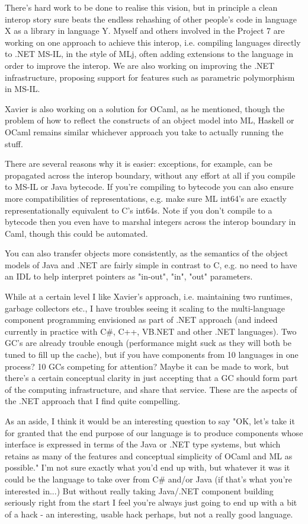 \documentclass[acmsmall,screen]{acmart}
\begin{document}
\begin{verbquote}
There's hard work to be done to realise this vision, but in principle a clean interop story sure beats the endless rehashing of other people's code in language X as a library in language Y.  Myself and others involved in the Project 7 are working on one approach to achieve this interop, i.e. compiling languages directly to .NET MS-IL, in the style of MLj, often adding extensions to the language in order to improve the interop.  We are also working on improving the .NET infrastructure, proposing support for features such as parametric polymorphism in MS-IL.  

Xavier is also working on a solution for OCaml, as he mentioned, though the problem of how to reflect the constructs of an object model into ML, Haskell or OCaml remains similar whichever approach you take to actually running the stuff.

There are several reasons why it is easier: exceptions, for example, can be propagated across the interop boundary, without any effort at all if you compile to MS-IL or Java bytecode.  If you're compiling to bytecode you can also ensure more compatibilities of representations, e.g. make sure ML int64's are exactly representationally equivalent to C's int64s.  Note if you don't compile to a bytecode then you even have to marshal integers across the interop boundary in Caml, though this could be automated.

You can also transfer objects more consistently, as the semantics of the object models of Java and .NET are fairly simple in contrast to C, e.g. no need to have an IDL to help interpret pointers as "in-out", "in", "out" parameters.

While at a certain level I like Xavier's approach, i.e. maintaining two runtimes, garbage collectors etc., I have troubles seeing it scaling to the multi-language component programming envisioned as part of .NET approach (and indeed currently in practice with C\#, C++, VB.NET and other .NET languages).  Two GC's are already trouble enough (performance might suck as they will both be tuned to fill up the cache), but if you have components from 10 languages in one process?  10 GCs competing for attention?  Maybe it can be made to work, but there's a certain conceptual clarity in just accepting that a GC should form part of the computing infrastructure, and share that service.  These are the aspects of the .NET approach that I find quite compelling.

As an aside, I think it would be an interesting question to say "OK, let's take it for granted that the end purpose of our language is to produce components whose interface is expressed in terms of the Java or .NET type systems, but which retains as many of the features and conceptual simplicity of OCaml and ML as possible."  I'm not sure exactly what you'd end up with, but whatever it was it could be the language to take over from C\# and/or Java (if that's what you're interested in...)  But without really taking Java/.NET component building seriously right from the start I feel you're always just going to end up with a bit of a hack - an interesting, usable hack perhaps, but not a really good language.


\end{verbquote}
\end{document}
